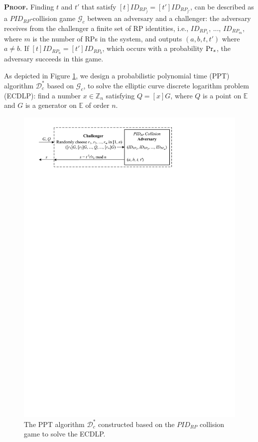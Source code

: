 \oldc
\noindent\textbf{\textsc{Proof.}}
Finding $t$ and $t'$ that satisfy $[t]ID_{RP_j} = [t']ID_{RP_{j'}}$, can be described as a $PID_{RP}$-collision game $\mathcal{G}_c$ between an adversary and a challenger: the adversary receives from the challenger a finite set of RP identities, i.e., $ID_{RP_1}$, ..., $ID_{RP_m}$, where $m$ is the number of RPs in the system, and outputs $(a, b, t, t')$ where $a \neq b$. If $[t]ID_{RP_a}=[t']ID_{RP_b}$, which occurs with a probability ${\rm Pr}_s$, the adversary succeeds in this game.

As depicted in Figure \ref{fig:ecdlp_algorithm}, we design a probabilistic polynomial time (PPT) algorithm $\mathcal{D}^*_c$ based on $\mathcal{G}_c$, to solve the elliptic curve discrete logarithm problem (ECDLP): find a number $x \in \mathbb{Z}_n$ satisfying $Q = [x]G$, where $Q$ is a point on $\mathbb{E}$ and $G$ is a generator on $\mathbb{E}$ of order $n$.


\begin{figure}[tb]
  \centering
  \includegraphics[width=0.96\linewidth]{fig/ecdlp_algorithm.pdf}
  \caption{The PPT algorithm $\mathcal{D}^*_c$ constructed based on the $PID_{RP}$ collision game to solve the ECDLP.}
  \label{fig:ecdlp_algorithm}
\end{figure}

